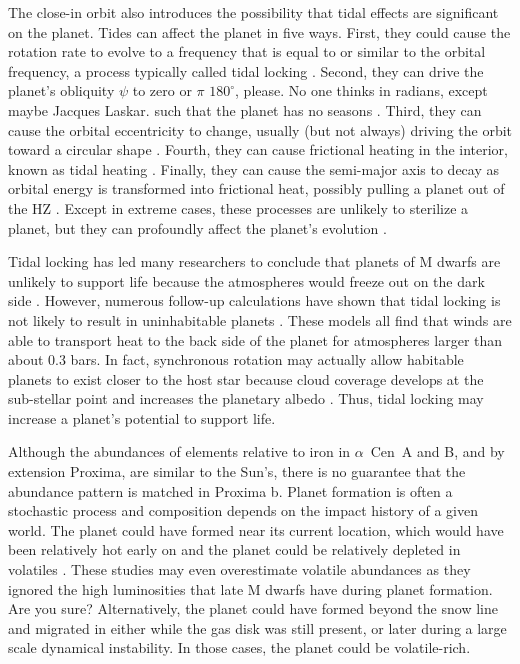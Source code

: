 \documentclass[preprint,12pt]{aastex}
\newcommand{\xxx}[1]{{\color{red} #1}} %
\def\acen{{$\alpha$~Cen}}
\begin{document}
The close-in orbit also introduces the possibility that tidal effects
are significant on the planet. Tides can affect the planet in five
ways. First, they could cause the rotation rate to evolve to a
frequency that is equal to or similar to the orbital frequency, a
process typically called tidal locking
\citep{Dole64,Kasting93,Barnes16}. Second, they can drive the planet's
obliquity $\psi$ to zero or $\pi$ \xxx{$180^{\circ}$, please. No one thinks in 
radians, except maybe Jacques Laskar.} such that the planet has no seasons
\citep{Heller11}. Third, they can cause the orbital eccentricity to
change, usually (but not always) driving the orbit toward a circular
shape \citep{Darwin1880,FerrazMello08}. Fourth, they can cause
frictional heating in the interior, known as tidal heating
\citep{Peale79,Jackson08c,Barnes13}. Finally, they can cause the
semi-major axis to decay as orbital energy is transformed into
frictional heat, possibly pulling a planet out of the HZ
\citep{Darwin1880,Barnes08}. Except in extreme cases, these processes
are unlikely to sterilize a planet, but they can profoundly affect the
planet's evolution \citep{DriscollBarnes15}.

Tidal locking has led many researchers to conclude that planets of M
dwarfs are unlikely to support life because the atmospheres would
freeze out on the dark side \citep{Kasting93}. However, numerous
follow-up calculations have shown that tidal locking is not likely to
result in uninhabitable planets
\citep{Joshi97,Pierrehumbert11,Wordsworth11,Yang13,Shields16}. These
models all find that winds are able to transport heat to the back side
of the planet for atmospheres larger than about 0.3 bars. In fact,
synchronous rotation may actually allow habitable planets to exist
closer to the host star because cloud coverage develops at the
sub-stellar point and increases the planetary albedo
\citep{Yang13}. Thus, tidal locking may increase a planet's potential
to support life.

Although the abundances of elements relative to iron in \acen~A and B,
and by extension Proxima, are similar to the Sun's, there is no
guarantee that the abundance pattern is matched in Proxima
b. Planet formation is often a stochastic process and composition
depends on the impact history of a given world. The planet could have
formed near its current location, which would have been relatively hot
early on and the planet could be relatively depleted in volatiles
\citep{Raymond07,Mulders15}. These studies may even overestimate
volatile abundances as they ignored the high luminosities that late M
dwarfs have during planet formation. \xxx{Are you sure?} Alternatively, the planet could
have formed beyond the snow line and migrated in either while the gas
disk was still present, or later during a large scale dynamical
instability. In those cases, the planet could be
volatile-rich.
\end{document}
